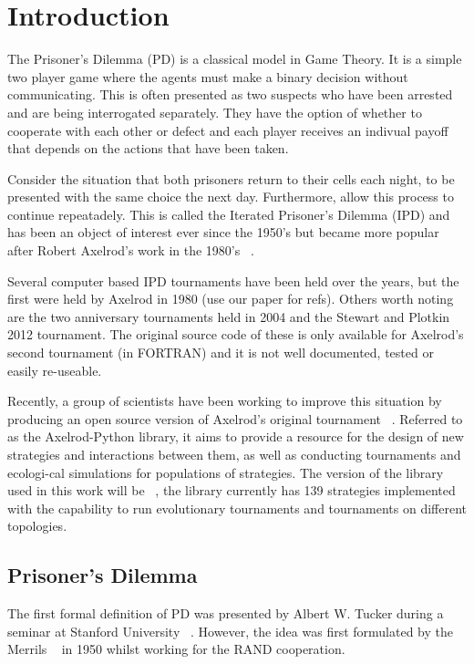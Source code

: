 
\chapter{Introduction}\label{cha:introduction}

The Prisoner's Dilemma (PD) is a classical model in Game Theory.
It is a simple two player game where the agents must make a binary decision without communicating.
This is often presented as two suspects who have been arrested and are being interrogated separately.
They have the option of whether to cooperate with each other or defect and each player receives an indivual payoff that depends on the actions that have been taken.

Consider the situation that both prisoners return to their cells each night, to be presented with the same choice the next day.
Furthermore, allow this process to continue repeatadely. 
This is called the Iterated Prisoner's Dilemma (IPD) and has been an object of interest ever since the 1950's but became more popular after Robert Axelrod's work in the 1980's ~\cite{Axelrod2016}.

Several computer based IPD tournaments have been held over the years, but the first were held by Axelrod in 1980 (use our paper for refs).
Others worth noting are the two anniversary tournaments  held in 2004 and the Stewart and Plotkin 2012 tournament.
The original source code of these is only available for Axelrod's second tournament (in FORTRAN) and it is not well documented, tested or easily re-useable.

Recently, a group of scientists have been working to improve this situation by producing an open source version of Axelrod's original tournament ~\cite{Knight2016}.
Referred to as the Axelrod-Python library, it aims to provide a resource for the design of new strategies and interactions between them, as well as conducting tournaments and ecologi-cal simulations for populations of strategies.
The version of the library used in this work will be ~\cite{axelrodproject}, the library currently has 139 strategies implemented with the capability to run evolutionary tournaments and tournaments on different topologies.

\section{Prisoner's Dilemma}
The first formal definition of PD was presented by Albert W. Tucker during a seminar at Stanford University ~\cite{Gass2005}.
However, the idea was first formulated by the Merrils ~\cite{Flood1958} in 1950 whilst working for the RAND cooperation.

